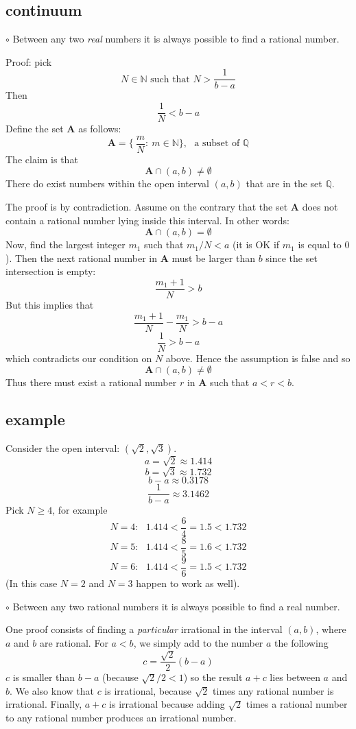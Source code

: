\documentclass[11pt, oneside]{article}
\begin{document}
\subsection*{continuum}

$\circ$  Between any two \emph{real} numbers it is always possible to find a rational number.  

Proof:  pick
\[ N \in \mathbb{N} \text{ such that } N > \frac{1}{b-a} \]
Then 
\[ \frac{1}{N} < b - a \]
Define the set $\mathbf{A}$ as follows:
\[ \mathbf{A} = \{ \ \frac{m}{N}: \ m \in \mathbb{N} \}, \ \ \ \text{a subset of } \mathbb{Q} \]
The claim is that
\[ \mathbf{A} \cap (a,b) \ne \emptyset \]
There do exist numbers within the open interval $(a,b)$ that are in the set $\mathbb{Q}$.

The proof is by contradiction.  Assume on the contrary that the set $\mathbf{A}$ does not contain a rational number lying inside this interval.  In other words:
\[ \mathbf{A} \cap (a,b) = \emptyset \]
Now, find the largest integer $m_1$ such that $m_1/N < a$ (it is OK if $m_1$ is equal to $0$).  Then the next rational number in $\mathbf{A}$ must be larger than $b$ since the set intersection is empty:
\[ \frac{m_1 + 1}{N} > b \]
But this implies that
\[ \frac{m_1 + 1}{N} - \frac{m_1}{N} > b - a \]
\[ \frac{1}{N} > b - a \]
which contradicts our condition on $N$ above.  Hence the assumption is false and so
\[ \mathbf{A} \cap (a,b) \ne \emptyset \]
Thus there must exist a rational number $r$ in $\mathbf{A}$ such that $a < r < b$.

\subsection*{example}
Consider the open interval:  $(\sqrt{2},\sqrt{3})$.  
\[ a = \sqrt{2} \approx 1.414 \]
\[ b = \sqrt{3} \approx 1.732 \]
\[ b-a \approx 0.3178 \]
\[ \frac{1}{b-a} \approx 3.1462 \]
Pick $N \ge 4$, for example
\[ N = 4: \ \ \  1.414 < \frac{6}{4} = 1.5 < 1.732 \]
\[ N = 5: \ \ \  1.414 < \frac{8}{5} = 1.6 < 1.732 \]
\[ N = 6: \ \ \  1.414 < \frac{9}{6} = 1.5 < 1.732 \]
(In this case $N=2$ and $N=3$ happen to work as well).

$\circ$  Between any two rational numbers it is always possible to find a real number.

One proof consists of finding a \emph{particular} irrational in the interval $(a,b)$, where $a$ and $b$ are rational.  For $a < b$, we simply add to the number $a$ the following
\[ c = \frac{\sqrt{2}}{2}(b - a) \]
$c$ is smaller than $b - a$ (because $\sqrt{2}/2 < 1$) so the result $a + c$ lies between $a$ and $b$.  We also know that $c$ is irrational, because $\sqrt{2}$ times any rational number is irrational.  Finally, $a + c$ is irrational because adding $\sqrt{2}$ times a rational number to any rational number produces an irrational number.
\end{document}
